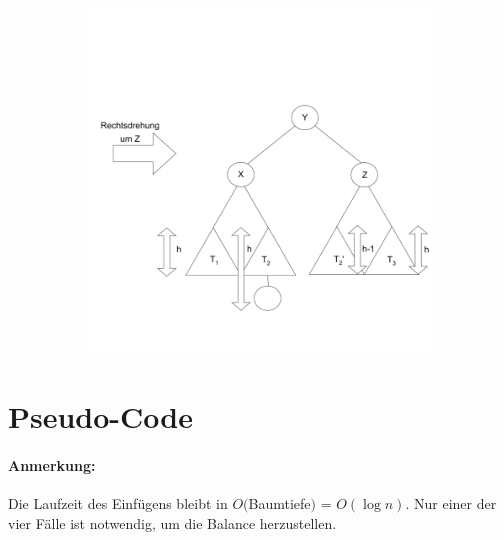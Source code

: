 \begin{figure}
\begin{subfigure}[H]{0.3\textwidth}
	\end{subfigure}
	\begin{subfigure}[H]{0.4\textwidth}
				\includegraphics[width=\linewidth]{11/Grafik/img7_doppelRotation_4.png}
	\end{subfigure}
\end{figure}

\clearpage


\section{Pseudo-Code}


\paragraph{Anmerkung:} Die Laufzeit des Einfügens bleibt in $O($Baumtiefe$)$ = $O(\log{n})$. Nur einer der vier Fälle ist notwendig, um die Balance herzustellen. 
\pagebreak